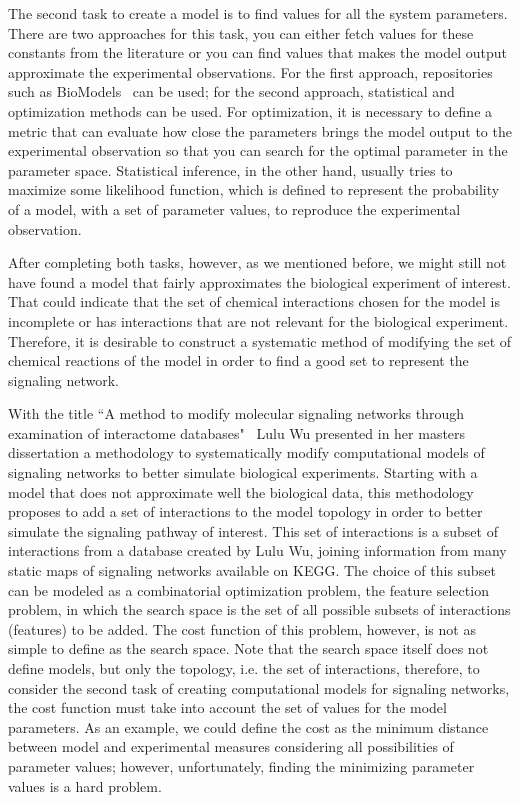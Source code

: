 The second task to create a model is to find values for all the system
parameters. There are two approaches for this task, you can either 
fetch values for these constants from the literature or you can find 
values that makes the model output approximate the experimental 
observations. For the first approach, repositories such as 
BioModels~\cite{le2006biomodels} can be used; for the second approach, 
statistical and optimization methods can be used. For optimization, it 
is necessary to define a metric that can evaluate how close the 
parameters brings the model output to the experimental observation so
that you can search for the optimal parameter in the parameter space. 
Statistical inference, in the other hand, usually tries to maximize some 
likelihood function, which is defined to represent the probability of a 
model, with a set of parameter values, to reproduce the experimental 
observation.

After completing both tasks, however, as we mentioned before, we might 
still not have found a model that fairly approximates the biological 
experiment of interest. That could indicate that the set of chemical 
interactions chosen for the model is incomplete or has interactions that
are not relevant for the biological experiment. Therefore, it is 
desirable to construct a systematic method of modifying the set of 
chemical reactions of the model in order to find a good set to represent 
the signaling network.

With the title ``A method to modify molecular signaling networks through
examination of interactome databases"~\cite{Wu15} Lulu Wu presented in 
her masters dissertation a methodology to systematically modify 
computational models of signaling networks to better simulate biological 
experiments. Starting with a model that does not approximate well the 
biological data, this methodology proposes to add a set of interactions
to the model topology in order to better simulate the signaling pathway 
of interest. This set of interactions is a subset of interactions from a 
database created by Lulu Wu, joining information from many static maps 
of signaling networks available on KEGG. The choice of this subset can 
be modeled as a combinatorial optimization problem, the feature 
selection problem, in which the search space is the set of all possible 
subsets of interactions (features) to be added. The cost function of 
this problem, however, is not as simple to define as the search space. 
Note that the search space itself does not define models, but only the 
topology, i.e. the set of interactions, therefore, to consider the 
second task of creating computational models for signaling networks, the 
cost function must take into account the set of values for the model 
parameters. As an example, we could define the cost as the minimum 
distance between model and experimental measures considering all 
possibilities of parameter values; however, unfortunately, finding the 
minimizing parameter values is a hard problem.

